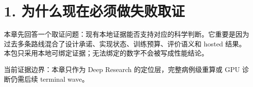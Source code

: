 \section{1. 为什么现在必须做失败取证}

本章先回答一个取证问题：现有本地证据能否支持对应的科学判断。它重要是因为过去多条路线混合了设计承诺、实现状态、训练预算、评价语义和 hosted 结果。本包只采用本地可绑定证据；无法绑定的数字不会被写成性能结论。



当前证据边界：本章只作为 Deep Research 的定位层，完整病例级重算或 GPU 诊断仍需后续 terminal wave。



\clearpage